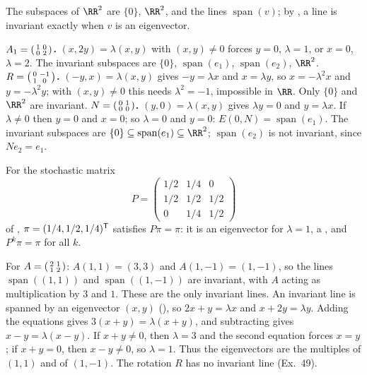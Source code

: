 \documentclass[10pt]{scrartcl}
\DeclareMathOperator{\spn}{span}\DeclareMathOperator{\nul}{null}\DeclareMathOperator{\range}{range}
\begin{document}
\begin{example*}
  The subspaces of $\RR^2$ are $\{0\}$, $\RR^2$, and the lines $\spn(v)$; by , a line is invariant exactly when $v$ is an eigenvector.
  \begin{steps}
    \ii \textbf{$A_1=\begin{psmallmatrix}1&0\\0&2\end{psmallmatrix}$.} $(x,2y)=\lambda(x,y)$ with $(x,y)\ne0$ forces $y=0$, $\lambda=1$, or $x=0$, $\lambda=2$. The invariant subspaces are $\{0\}$, $\spn(e_1)$, $\spn(e_2)$, $\RR^2$.
    \ii \textbf{$R=\begin{psmallmatrix}0&-1\\1&0\end{psmallmatrix}$.} $(-y,x)=\lambda(x,y)$ gives $-y=\lambda x$ and $x=\lambda y$, so $x=-\lambda^2x$ and $y=-\lambda^2 y$; with $(x,y)\ne0$ this needs $\lambda^2=-1$, impossible in $\RR$. Only $\{0\}$ and $\RR^2$ are invariant.
    \ii \textbf{$N=\begin{psmallmatrix}0&1\\0&0\end{psmallmatrix}$.} $(y,0)=\lambda(x,y)$ gives $\lambda y=0$ and $y=\lambda x$. If $\lambda\ne0$ then $y=0$ and $x=0$; so $\lambda=0$ and $y=0$: $E(0,N)=\spn(e_1)$. The invariant subspaces are $\{0\}\subseteq\spn(e_1)\subseteq\RR^2$; $\spn(e_2)$ is not invariant, since $Ne_2=e_1$.
  \end{steps}
\end{example*}

\begin{example*}
  For the stochastic matrix
  \[
    P = \begin{pmatrix} 1/2 & 1/4 & 0 \\ 1/2 & 1/2 & 1/2 \\ 0 & 1/4 & 1/2 \end{pmatrix}
  \]
  of , $\pi=(1/4,1/2,1/4)^{\mathsf T}$ satisfies $P\pi=\pi$: it is an eigenvector for $\lambda=1$, a , and $P^k\pi=\pi$ for all $k$.
\end{example*}

\revisit For $A=\begin{psmallmatrix}2&1\\1&2\end{psmallmatrix}$: $A(1,1)=(3,3)$ and $A(1,-1)=(1,-1)$, so the lines $\spn((1,1))$ and $\spn((1,-1))$ are invariant, with $A$ acting as multiplication by $3$ and $1$. These are the only invariant lines. An invariant line is spanned by an eigenvector $(x,y)$ (), so $2x+y=\lambda x$ and $x+2y=\lambda y$. Adding the equations gives $3(x+y)=\lambda(x+y)$, and subtracting gives $x-y=\lambda(x-y)$. If $x+y\ne0$, then $\lambda=3$ and the second equation forces $x=y$; if $x+y=0$, then $x-y\ne0$, so $\lambda=1$. Thus the eigenvectors are the multiples of $(1,1)$ and of $(1,-1)$. The rotation $R$ has no invariant line (Ex.~49).
\end{document}
